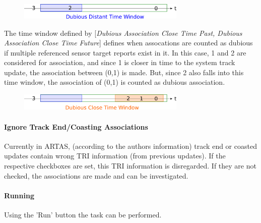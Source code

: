 \begin{figure}[H]
  \center
    \includegraphics[width=8cm]{figures/artas_assoc_dubious_distant_window.png}
\end{figure}


The time window defined by [\textit{Dubious Association Close Time Past, Dubious Association Close Time Future}] defines when assocations are counted as dubious if multiple referenced sensor target reports exist in it. In this case, 1 and 2 are considered for association, and since 1 is closer in time to the system track update, the association between (0,1) is made. But, since 2 also falls into this time window, the association of (0,1) is counted as dubious association.

\begin{figure}[H]
  \center
    \includegraphics[width=8cm]{figures/artas_assoc_dubious_close_window.png}
\end{figure}


\paragraph{Ignore Track End/Coasting Associations}

Currently in ARTAS, (according to the authors information) track end or coasted updates contain wrong TRI information (from previous updates). If the respective checkboxes are set, this TRI information is disregarded. If they are not checked, the associations are made and can be investigated.

\paragraph{Running}

Using the 'Run' button the task can be performed.

% 
% 
% 
% 
% 
